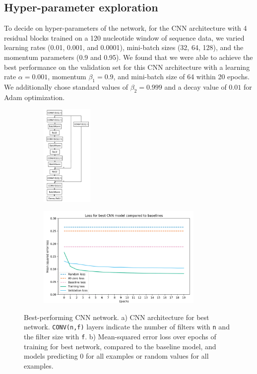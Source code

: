 \documentclass{article}
\begin{document}
\subsection{Hyper-parameter exploration}
To decide on hyper-parameters of the network, for the CNN architecture with 4 residual blocks trained on a 120 nucleotide window of sequence data, we varied learning rates (0.01, 0.001, and 0.0001), mini-batch sizes (32, 64, 128), and the momentum parameters (0.9 and 0.95). We found that we were able to achieve the best performance on the validation set for this CNN architecture with a learning rate $\alpha = 0.001$, momentum $\beta_1 = 0.9$, and mini-batch size of 64 within 20 epochs. We additionally chose standard values of $\beta_2 = 0.999$ and a decay value of $0.01$ for Adam optimization. 


\begin{figure}[H]
\centering
\begin{subfigure}{.3 \textwidth}
\centering
\includegraphics[width=2.5cm]{../figures/cnn_architecture.png} \caption{} 
\label{fig:architecture}
\end{subfigure}
\begin{subfigure}{.65 \textwidth}
\centering
\includegraphics[width=8cm]{../figures/loss.png} \caption{}  
\label{fig:loss}
\end{subfigure}
\caption{Best-performing CNN network. a) CNN architecture for best network. \texttt{CONV(n,f)} layers indicate the number of filters with \texttt{n} and the filter size with \texttt{f}. b) Mean-squared error loss over epochs of training for best network, compared to the baseline model, and models predicting 0 for all examples or random values for all examples.}
\end{figure}
\end{document}
